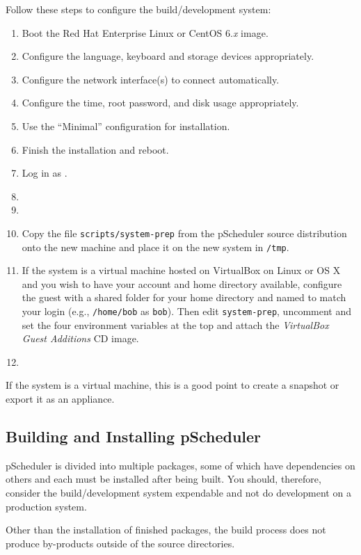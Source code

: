 \documentclass[10pt,titlepage]{article}
\begin{document}
Follow these steps to configure the build/development system:

\begin{enumerate}
\item Boot the Red Hat Enterprise Linux or CentOS 6.{\it x} image.
\item Configure the language, keyboard and storage devices
  appropriately.
\item Configure the network interface(s) to connect automatically.
\item Configure the time, root password, and disk usage appropriately.
\item Use the ``Minimal'' configuration for installation.
\item Finish the installation and reboot.
\item Log in as \root.
\item 
\item {}
\item Copy the file {\tt scripts/system-prep} from the pScheduler
  source distribution onto the new machine and place it on the new
  system in {\tt /tmp}.
\item If the system is a virtual machine hosted on VirtualBox on Linux
  or OS X and you wish to have your account and home directory
  available, configure the guest with a shared folder for your home
  directory and named to match your login (e.g., {\tt /home/bob} as
  {\tt bob}).  Then edit {\tt system-prep}, uncomment and set the four
  environment variables at the top and attach the {\it VirtualBox
    Guest Additions} CD image.
\item {}
\end{enumerate}

If the system is a virtual machine, this is a good point to create a
snapshot or export it as an appliance.


\subsection{Building and Installing pScheduler}

pScheduler is divided into multiple packages, some of which have
dependencies on others and each must be installed after being built.
You should, therefore, consider the build/development system
expendable and not do development on a production system.

Other than the installation of finished packages, the build process
does not produce by-products outside of the source directories.
\end{document}
